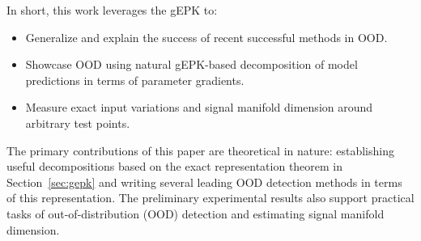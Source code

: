 

In short, this work leverages the gEPK to:
\begin{itemize}
    \item Generalize and explain the success of recent successful methods in OOD.
    \item Showcase OOD using natural gEPK-based decomposition of model predictions in terms of parameter gradients.
    \item Measure exact input variations and signal manifold dimension around arbitrary test points.

\end{itemize}
The primary contributions of this paper are theoretical in nature: establishing useful decompositions based on the exact representation theorem in Section~\ref{sec:gepk} and writing several leading OOD detection methods in terms of this representation. The preliminary experimental results also support practical tasks of out-of-distribution (OOD) detection and estimating signal manifold dimension. 

\label{sec:input}



